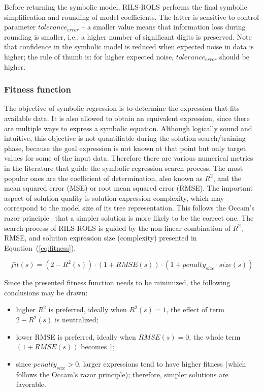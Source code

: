 \documentclass{bmcart}
\begin{document}
Before returning the symbolic model, \textsc{RILS}-\textsc{ROLS}  performs the final symbolic simplification and rounding of model coefficients. The latter is sensitive to control parameter $tolerance_{error}$ -- a smaller value means that information loss during rounding is smaller, i.e., a higher number of significant digits is preserved. Note that confidence in the symbolic model is reduced when expected noise in data is higher; the rule of thumb is: for higher expected noise, $tolerance_{error}$ should be higher. 


\subsubsection{Fitness function}\label{sec:fitness}


The objective of symbolic regression is to determine the expression that fits available data. It is also allowed to obtain an equivalent expression, since there are multiple ways to express a symbolic equation. Although logically sound and intuitive, this objective is not quantifiable during the solution search/training phase, because the goal expression is not known at that point but only target values for some of the input data. Therefore there are various numerical metrics in the literature that guide the symbolic regression search process. The most popular ones are the coefficient of determination, also known as $R^2$, and the mean squared error (MSE) or root mean squared error (RMSE). The important aspect of solution quality is solution expression complexity, which may correspond to the model size of its tree representation. This follows the Occam's razor principle~\cite{costa2020fast} that a simpler solution  is more likely to be the correct one. 
The search process of \textsc{RILS}-\textsc{ROLS}  is guided by the non-linear combination of $R^2$, RMSE, and solution expression size (complexity) presented in Equation~(\ref{eq:fitness}). 

\begin{equation}
	\label{eq:fitness}
	fit(s) = (2-R^2(s)) \cdot (1+RMSE(s)) \cdot (1+penalty_{size} \cdot size(s))
\end{equation}

Since the presented fitness function needs to be minimized, the following conclusions may be drawn:
\begin{itemize}
	\item higher $R^2$ is preferred, ideally when $R^2(s)=1$, the effect of term $2-R^2(s)$ is neutralized; %
	\item lower RMSE is preferred, ideally when $RMSE(s)=0$, the whole term $(1+RMSE(s))$ becomes 1;
	\item since $penalty_{size} > 0$, larger expressions tend to have higher fitness (which follows the Occam's razor principle); therefore, simpler solutions are favorable. 
\end{itemize}
\end{document}
